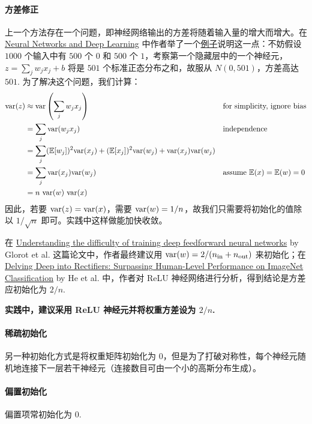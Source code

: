 \paragraph{方差修正}
上一个方法存在一个问题，即神经网络输出的方差将随着输入量的增大而增大。在 \href{http://neuralnetworksanddeeplearning.com/}{Neural Networks and Deep Learning} 中作者举了一个\href{http://neuralnetworksanddeeplearning.com/chap3.html\#weight\_initialization}{例子}说明这一点：不妨假设 $1000$ 个输入中有 $500$ 个 $0$ 和 $500$ 个 $1$，考察第一个隐藏层中的一个神经元，$z=\sum_jw_jx_j+b$ 将是 $501$ 个标准正态分布之和，故服从 $N(0,501)$，方差高达 $501$. 为了解决这个问题，我们计算：
\begin{align*}
\mathrm{var}(z)&\approx\mathrm{var}\left(\sum_jw_jx_j\right)&&\text{for simplicity, ignore bias}\\
&=\sum_{j}\mathrm{var}(w_jx_j)&&\text{independence}\\
&=\sum_j(\mathbb{E} [w_j])^2\mathrm{var}(x_j)+(\mathbb{E}[x_j])^2\mathrm{var}(w_j)+\mathrm{var}(x_j)\mathrm{var}(w_j)\\
&=\sum_j\mathrm{var}(x_j)\mathrm{var}(w_j)&&\text{assume }\mathbb{E}(x)=\mathbb{E}(w)=0\\
&=n\ \mathrm{var}(w)\ \mathrm{var}(x)
\end{align*}
因此，若要 $\mathrm{var}(z)=\mathrm{var}(x)$，需要 $\mathrm{var}(w)=1/n$，故我们只需要将初始化的值除以 $1/\sqrt n$ 即可。实践中这样做能加快收敛。
\begin{com}
    在 \href{https://proceedings.mlr.press/v9/glorot10a/glorot10a.pdf}{Understanding the difficulty of training deep feedforward neural networks} by Glorot et al. 这篇论文中，作者最终建议用 $\mathrm{var}(w)=2/(n_\text{in}+n_\text{out})$ 来初始化；在 \href{https://arxiv.org/abs/1502.01852}{Delving Deep into Rectifiers: Surpassing Human-Level Performance on ImageNet Classification} by He et al. 中，作者对 ReLU 神经网络进行分析，得到结论是方差应初始化为 $2/n$.
    
    \textbf{实践中，建议采用 ReLU 神经元并将权重方差设为 $2/n$.}
\end{com}

\paragraph{稀疏初始化}
另一种初始化方式是将权重矩阵初始化为 $0$，但是为了打破对称性，每个神经元随机地连接下一层若干神经元（连接数目可由一个小的高斯分布生成）。

\paragraph{偏置初始化}
偏置项常初始化为 $0$.

